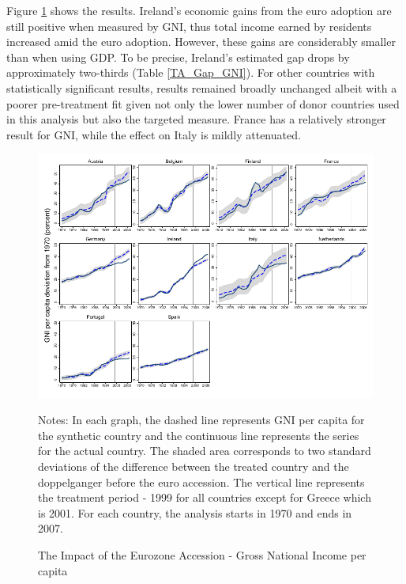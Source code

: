 \documentclass[12pt]{article}
\newcommand{\annote}[1]{\parbox{\textwidth}{\renewcommand{\baselinestretch}{1.0}\vspace{12pt} \small Notes: #1}}
\begin{document}
Figure \ref{F_GNI} shows the results. Ireland's economic gains from the euro adoption are still positive when measured by GNI, thus total income earned by residents increased amid the euro adoption. However, these gains are considerably smaller than when using GDP. To be precise, Ireland's estimated gap drops by approximately two-thirds (Table \ref{TA_Gap_GNI}). For other countries with statistically significant results, results remained broadly unchanged albeit with a poorer pre-treatment fit given not only the lower number of donor countries used in this analysis but also the targeted measure. France has a relatively stronger result for GNI, while the effect on Italy is mildly attenuated.

\begin{figure}[h!]
    \centering
    \caption{The Impact of the Eurozone Accession - Gross National Income per capita}
    \includegraphics[width=\textwidth]{Output/Figures/SCM_gni_Annual.pdf}
    \annote{In each graph, the dashed line represents GNI per capita for the synthetic country and the continuous line represents the series for the actual country. The shaded area corresponds to two standard deviations of the difference between the treated country and the doppelganger before the euro accession. The vertical line represents the treatment period - 1999 for all countries except for Greece which is 2001. For each country, the analysis starts in 1970 and ends in 2007.}
    \label{F_GNI}
\end{figure}
\end{document}

